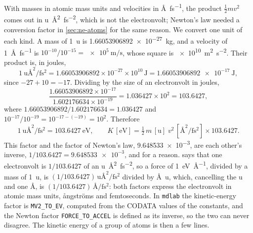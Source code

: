 With masses in atomic mass units and velocities in
\si{\angstrom\per\femto\second}, the product $\frac12 mv^2$ comes out in
\si{\amu\angstrom\squared\per\femto\second\squared}, which is not the
electronvolt; Newton's law needed a conversion factor in
\cref{sec:ne-atoms} for the same reason. We convert one unit of each
kind. A mass of \SI{1}{\amu} is \SI{1.66053906892e-27}{\kilogram}, and a
velocity of \SI{1}{\angstrom\per\femto\second} is $10^{-10}/10^{-15} =
\SI{e5}{\metre\per\second}$, whose square is
\SI{e10}{\metre\squared\per\second\squared}. Their product is, in joules,
\begin{equation*}
   \SI{1}{\amu\angstrom\squared\per\femto\second\squared}
   = 1.66053906892\times10^{-27}\times10^{10}\,\si{\joule}
   = \SI{1.66053906892e-17}{\joule} ,
\end{equation*}
since $-27 + 10 = -17$. Dividing by the size of an electronvolt in joules,
\begin{equation*}
   \frac{1.66053906892\times10^{-17}}{1.602176634\times10^{-19}}
   = 1.036427\times10^{2} = 103.6427 ,
\end{equation*}
where $1.66053906892/1.602176634 = 1.036427$ and $10^{-17}/10^{-19} =
10^{-17-(-19)} = 10^{2}$. Therefore
\begin{equation}
   \SI{1}{\amu\angstrom\squared\per\femto\second\squared}
   = \SI{103.6427}{\electronvolt} ,
   \qquad
   K\,[\si{\electronvolt}] = \tfrac12\,m\,[\si{\amu}]\;
   v^2\,[\si{\angstrom\squared\per\femto\second\squared}]
   \times103.6427 .
   \label{eq:en-mv2}
\end{equation}
This factor and the factor of Newton's law, \num{9.648533e-3}, are each
other's inverse, $1/103.6427 = \num{9.648533e-3}$, and for a reason.
 says that one electronvolt is $1/103.6427$ of an
\si{\amu\angstrom\squared\per\femto\second\squared}, so a force of
\SI{1}{\electronvolt\per\angstrom}, divided by a mass of \SI{1}{\amu},
is $(1/103.6427)\,\si{\amu\angstrom\squared\per\femto\second\squared}$
divided by \si{\angstrom\amu}, which, cancelling the \si{\amu} and one
\si{\angstrom}, is $(1/103.6427)\,\si{\angstrom\per\femto\second\squared}$:
both factors
express the electronvolt in atomic mass units, \aa ngstr\"oms and
femtoseconds. In \texttt{mdlab} the kinetic-energy factor is
\texttt{MV2\_TO\_EV}, computed from the CODATA values of the constants,
and the Newton factor \texttt{FORCE\_TO\_ACCEL} is defined as its inverse,
so the two can never disagree. The kinetic energy of a group of atoms is
then a few lines.

